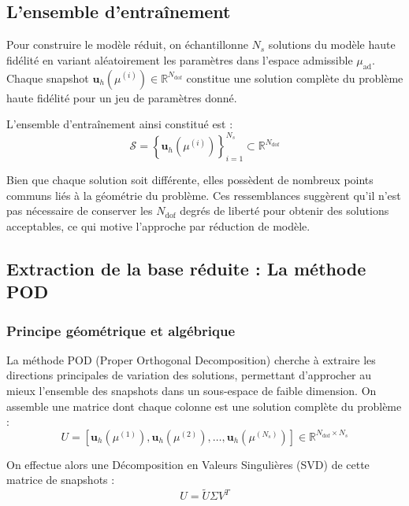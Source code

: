 \documentclass[12pt,a4paper]{article}
\begin{document}
\subsection{L'ensemble d'entraînement}

Pour construire le modèle réduit, on échantillonne $N_s$ solutions du modèle haute fidélité en variant aléatoirement les paramètres dans l'espace admissible $\mu_{\text{ad}}$. Chaque snapshot $\mathbf{u}_h(\mu^{(i)}) \in \mathbb{R}^{N_{\text{dof}}}$ constitue une solution complète du problème haute fidélité pour un jeu de paramètres donné.

L'ensemble d'entraînement ainsi constitué est :
\begin{equation*}
    \mathcal{S} = \left\{ \mathbf{u}_h(\mu^{(i)}) \right\}_{i=1}^{N_s} \subset \mathbb{R}^{N_{\text{dof}}}
\end{equation*}
 
Bien que chaque solution soit différente, elles possèdent de nombreux points communs liés à la géométrie du problème. Ces ressemblances suggèrent qu'il n'est pas nécessaire de conserver les $N_{\text{dof}}$ degrés de liberté pour obtenir des solutions acceptables, ce qui motive l'approche par réduction de modèle.


\subsection{Extraction de la base réduite : La méthode POD \label{sec:POD}}

\subsubsection{Principe géométrique et algébrique}

La méthode POD (Proper Orthogonal Decomposition) cherche à extraire les directions principales de variation des solutions, permettant d'approcher au mieux l'ensemble des snapshots dans un sous-espace de faible dimension. On assemble une matrice dont chaque colonne est une solution complète du problème :
\begin{equation*}
    U = [\mathbf{u}_h(\mu^{(1)}), \mathbf{u}_h(\mu^{(2)}), \ldots, \mathbf{u}_h(\mu^{(N_s)})] \in \mathbb{R}^{N_{\text{dof}} \times N_s}
\end{equation*}

On effectue alors une Décomposition en Valeurs Singulières (SVD) de cette matrice de snapshots :
\begin{equation*}
    U = \tilde{U} \Sigma V^T
\end{equation*}
\end{document}
